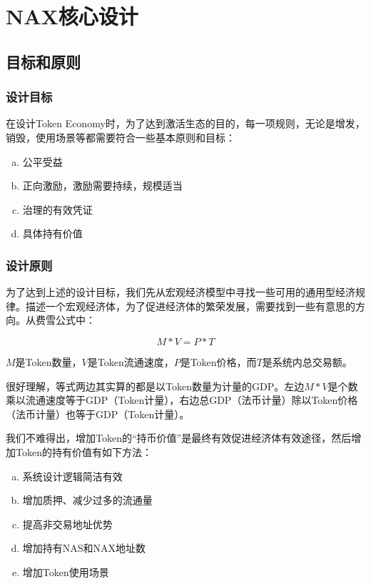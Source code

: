 \section{NAX核心设计}
\subsection{目标和原则}
\subsubsection{设计目标}
在设计Token Economy时，为了达到激活生态的目的，每一项规则，无论是增发，销毁，使用场景等都需要符合一些基本原则和目标：

\begin{enumerate}[a.]
	\item 公平受益
	\item 正向激励，激励需要持续，规模适当
    \item 治理的有效凭证
    \item 具体持有价值
\end{enumerate}

\subsubsection{设计原则}
为了达到上述的设计目标，我们先从宏观经济模型中寻找一些可用的通用型经济规律。描述一个宏观经济体，为了促进经济体的繁荣发展，需要找到一些有意思的方向。从费雪公式中：

\begin{equation}
M * V = P * T
\end{equation}

\(M\)是Token数量，\(V\)是Token流通速度，\(P\)是Token价格，而\(T\)是系统内总交易额。

很好理解，等式两边其实算的都是以Token数量为计量的GDP。左边\(M * V\)是个数乘以流通速度等于GDP（Token计量），右边总GDP（法币计量）除以Token价格（法币计量）也等于GDP（Token计量）。

我们不难得出，增加Token的“持币价值”是最终有效促进经济体有效途径，然后增加Token的持有价值有如下方法：

\begin{enumerate}[a.]
	\item 系统设计逻辑简洁有效
	\item 增加质押、减少过多的流通量
	\item 提高非交易地址优势
	\item 增加持有NAS和NAX地址数
	\item 增加Token使用场景
\end{enumerate}

